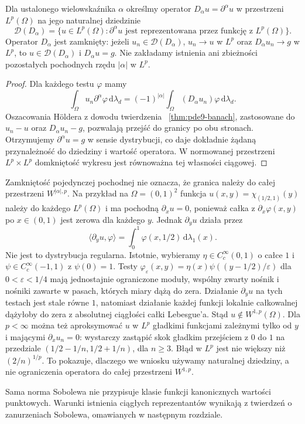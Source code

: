 \begin{wniosek}
\label{cor:pde9-closed}
Dla ustalonego wielowskaźnika $\alpha$ określmy operator
$D_\alpha u=\partial^\alpha u$ w przestrzeni $L^p(\Omega)$
na jego naturalnej dziedzinie
\[
 \mathcal D(D_\alpha)=
 \{u\in L^p(\Omega):\partial^\alpha u
 \text{ jest reprezentowana przez funkcję z }L^p(\Omega)\}.
\]
Operator $D_\alpha$ jest zamknięty: jeżeli
$u_n\in\mathcal D(D_\alpha)$, $u_n\to u$ w $L^p$ oraz
$D_\alpha u_n\to g$ w $L^p$, to $u\in\mathcal D(D_\alpha)$
i $D_\alpha u=g$.
Nie zakładamy istnienia ani zbieżności pozostałych
pochodnych rzędu $|\alpha|$ w $L^p$.
\end{wniosek}
\begin{proof}
Dla każdego testu $\varphi$ mamy
\[
 \int_\Omega u_n\partial^\alpha\varphi\,\mathrm d\lambda_d
 =(-1)^{|\alpha|}\int_\Omega(D_\alpha u_n)\varphi\,\mathrm d\lambda_d.
\]
Oszacowania Höldera z dowodu twierdzenia
~\ref{thm:pde9-banach}, zastosowane do $u_n-u$ oraz
$D_\alpha u_n-g$, pozwalają przejść do granicy po obu stronach.
Otrzymujemy $\partial^\alpha u=g$ w sensie dystrybucji,
co daje dokładnie żądaną przynależność do dziedziny i wartość
operatora. W normowanej przestrzeni $L^p\times L^p$
domkniętość wykresu jest równoważna tej własności ciągowej.
\end{proof}

\begin{uwaga}
Zamkniętość pojedynczej pochodnej nie oznacza, że granica
należy do całej przestrzeni $W^{|\alpha|,p}$.
Na przykład na $\Omega=(0,1)^2$ funkcja
$u(x,y)=\chi_{(1/2,1)}(y)$ należy do każdego $L^p(\Omega)$
i ma pochodną $\partial_x u=0$, ponieważ całka z
$\partial_x\varphi(x,y)$ po $x\in(0,1)$ jest zerowa dla każdego
$y$. Jednak $\partial_y u$ działa przez
\[
 \langle\partial_y u,\varphi\rangle
 =\int_0^1\varphi(x,1/2)\,\mathrm d\lambda_1(x).
\]
Nie jest to dystrybucja regularna. Istotnie, wybieramy
$\eta\in C_c^\infty(0,1)$ o całce $1$ i
$\psi\in C_c^\infty(-1,1)$ z $\psi(0)=1$.
Testy $\varphi_\varepsilon(x,y)=\eta(x)\psi((y-1/2)/\varepsilon)$
dla $0<\varepsilon<1/4$ mają jednostajnie ograniczone moduły,
wspólny zwarty nośnik i nośniki zawarte w pasach,
których miary dążą do zera. Działanie $\partial_y u$
na tych testach jest stale równe $1$, natomiast działanie
każdej funkcji lokalnie całkowalnej dążyłoby do zera
z absolutnej ciągłości całki Lebesgue'a.
Stąd $u\notin W^{1,p}(\Omega)$.
Dla $p<\infty$ można też aproksymować $u$ w $L^p$
gładkimi funkcjami zależnymi tylko od $y$ i mającymi
$\partial_x u_n=0$: wystarczy zastąpić skok gładkim
przejściem z $0$ do $1$ na przedziale
$(1/2-1/n,1/2+1/n)$, dla $n\ge3$.
Błąd w $L^p$ jest nie większy niż $(2/n)^{1/p}$.
To pokazuje, dlaczego we wniosku używamy naturalnej dziedziny,
a nie ograniczenia operatora do całej przestrzeni $W^{1,p}$.

Sama norma Sobolewa nie przypisuje klasie funkcji
kanonicznych wartości punktowych. Warunki istnienia
ciągłych reprezentantów wynikają z twierdzeń o zanurzeniach
Sobolewa, omawianych w następnym rozdziale.
\end{uwaga}


